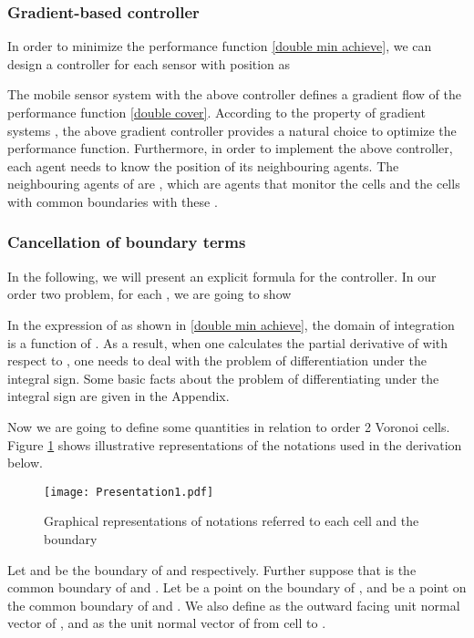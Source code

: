 \documentclass[letterpaper, 10 pt, conference]{ieeeconf}
\begin{document}
\subsubsection{Gradient-based controller}
\label{Gradient-based controller}
In order to minimize the performance function \eqref{double min achieve}, we can design a controller for each sensor with position  as

The mobile sensor system with the above controller defines a gradient flow of the performance function \eqref{double cover}. According to the property of  gradient systems \cite{absil2006stable}, the above gradient controller provides a natural choice to optimize the performance function.
Furthermore, in order to implement the above controller, each agent needs to know the position of its neighbouring agents.
The neighbouring agents of  are , which are agents that monitor the cells  and the cells with common boundaries with these .

\subsubsection{Cancellation of boundary terms}
In the following, we will present an explicit formula for the controller. In our order two problem, for each , we are going to show


In the expression of  as shown in \eqref{double min achieve}, the domain of integration is a function of . As a result, when one calculates the partial derivative of  with respect to , one needs to deal with the problem of differentiation under the integral sign. Some basic facts about the problem of differentiating under the integral sign are given in the Appendix.

Now we are going to define some quantities in relation to order 2 Voronoi cells. Figure \ref{fig_notation} shows  illustrative representations of the notations used in the derivation below.
\begin{figure}[!ht]
\begin{center}
\texttt{[image: Presentation1.pdf]}
\end{center}
\caption{Graphical representations of notations referred to each cell and the boundary}
\label{fig_notation}
\end{figure}
Let  and  be the boundary of  and  respectively. Further suppose that  is the common boundary of  and . Let  be a point on the boundary of , and  be a point on the common boundary of  and . We also define  as the outward facing unit normal vector of , and  as the unit normal vector of  from cell  to .
\end{document}
